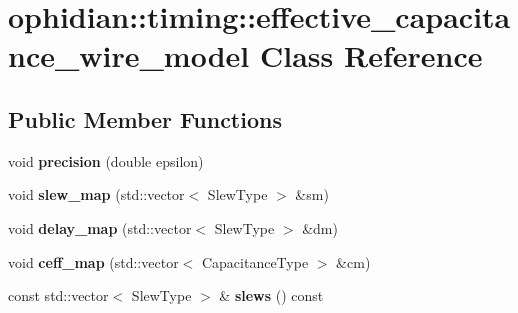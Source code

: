 \hypertarget{classophidian_1_1timing_1_1effective__capacitance__wire__model}{\section{ophidian\-:\-:timing\-:\-:effective\-\_\-capacitance\-\_\-wire\-\_\-model Class Reference}
\label{classophidian_1_1timing_1_1effective__capacitance__wire__model}
}
\subsection*{Public Member Functions}
\begin{DoxyCompactItemize}
\item 
\hypertarget{classophidian_1_1timing_1_1effective__capacitance__wire__model_aa18d4d2dd3dbc66a65fbcd746c638632}{void {\bfseries precision} (double epsilon)}\label{classophidian_1_1timing_1_1effective__capacitance__wire__model_aa18d4d2dd3dbc66a65fbcd746c638632}

\item 
\hypertarget{classophidian_1_1timing_1_1effective__capacitance__wire__model_a8b39a287f09bdca01263d17eb9e9391d}{void {\bfseries slew\-\_\-map} (std\-::vector$<$ Slew\-Type $>$ \&sm)}\label{classophidian_1_1timing_1_1effective__capacitance__wire__model_a8b39a287f09bdca01263d17eb9e9391d}

\item 
\hypertarget{classophidian_1_1timing_1_1effective__capacitance__wire__model_ad62550fe147307510a0a5afa51fa8993}{void {\bfseries delay\-\_\-map} (std\-::vector$<$ Slew\-Type $>$ \&dm)}\label{classophidian_1_1timing_1_1effective__capacitance__wire__model_ad62550fe147307510a0a5afa51fa8993}

\item 
\hypertarget{classophidian_1_1timing_1_1effective__capacitance__wire__model_afc2f0a782ac51842cbe2de7b725bd699}{void {\bfseries ceff\-\_\-map} (std\-::vector$<$ Capacitance\-Type $>$ \&cm)}\label{classophidian_1_1timing_1_1effective__capacitance__wire__model_afc2f0a782ac51842cbe2de7b725bd699}

\item 
\hypertarget{classophidian_1_1timing_1_1effective__capacitance__wire__model_aa5c592f1d0abb6e0c2bd4b38c782867e}{const std\-::vector$<$ Slew\-Type $>$ \& {\bfseries slews} () const }\label{classophidian_1_1timing_1_1effective__capacitance__wire__model_aa5c592f1d0abb6e0c2bd4b38c782867e}


\end{DoxyCompactItemize}
